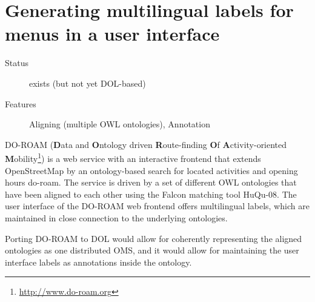 \documentclass[10pt,%
\ifpretendfinal
final%
\else
draft%
\fi,
]{scrreprt}
\newcommand{\bref}[1]{[\ref{#1}]}
\newcommand{\sclause}[1]{\section{#1}}
\renewcommand{\bref}[1]{#1}
\begin{document}
\newenvironment{usecase}[3]{\sclause{#1}%
\begin{description}
\item[Status] #2
\item[Features] #3
\end{description}
}{}
\begin{usecase}{Generating multilingual labels for menus in a user interface}{exists (but not yet DOL-based)}{Aligning (multiple OWL ontologies), Annotation}
  DO-ROAM (\textbf{D}ata and \textbf{O}ntology driven \textbf{R}oute-finding \textbf{O}f \textbf{A}ctivity-oriented \textbf{M}obility\footnote{\url{http://www.do-roam.org}}) is a web service with an interactive frontend that extends OpenStreetMap by an ontology-based search for located activities and opening hours \bref{do-roam}.  The service is driven by a set of different OWL ontologies that have been aligned to each other using the Falcon matching tool \bref{HuQu-08}.  The user interface of the DO-ROAM web frontend offers multilingual labels, which are maintained in close connection to the underlying ontologies.

  Porting DO-ROAM to DOL would allow for coherently representing the aligned ontologies as one distributed OMS, and it would allow for maintaining the user interface labels as annotations inside the ontology.
\end{usecase}
\end{document}
